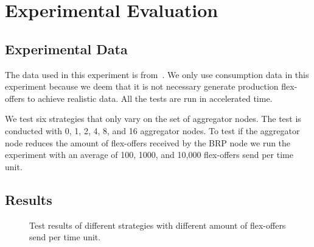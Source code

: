 \documentclass{ifacconf}
\begin{document}
\section{Experimental Evaluation}
\subsection{Experimental Data}

The data used in this experiment is from~\cite{meregio}. 
We only use consumption data in this experiment because we deem that it is not necessary generate production flex-offers to achieve realistic data.  
All the tests are run in accelerated time.


We test six strategies that only vary on the set of aggregator nodes. The test is conducted with 0, 1, 2, 4, 8, and 16 aggregator nodes. 
To test if the aggregator node reduces the amount of flex-offers received by the BRP node we run the experiment with an average of 100, 1000, and 10,000 flex-offers send per time unit. 

\subsection{Results}

\begin{figure}[]
   \centering
  \caption{Test results of different strategies with different amount of flex-offers send per time unit.}
  \label{fig:communicationservice}
\end{figure}
\end{document}
